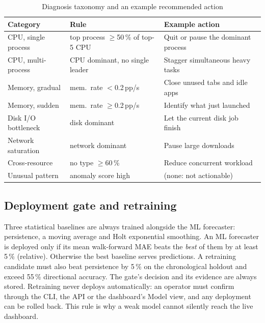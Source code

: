 \documentclass[conference]{IEEEtran}
\newcommand{\pp}{\,pp}
\begin{document}
\begin{table}[t]
\centering
\caption{Diagnosis taxonomy and an example recommended action}
\label{tab:taxonomy}
\begin{tabular}{@{}p{2.7cm}p{2.3cm}p{2.4cm}@{}}
\toprule
Category & Rule & Example action \\
\midrule
CPU, single process & top process $\ge$50\,\% of top-5 CPU & Quit or pause the dominant process \\
CPU, multi-process & CPU dominant, no single leader & Stagger simultaneous heavy tasks \\
Memory, gradual & mem.\ rate $<$0.2\pp/s & Close unused tabs and idle apps \\
Memory, sudden & mem.\ rate $\ge$0.2\pp/s & Identify what just launched \\
Disk I/O bottleneck & disk dominant & Let the current disk job finish \\
Network saturation & network dominant & Pause large downloads \\
Cross-resource & no type $\ge$60\,\% & Reduce concurrent workload \\
Unusual pattern & anomaly score high & (none: not actionable) \\
\bottomrule
\end{tabular}
\end{table}

\subsection{Deployment gate and retraining}\label{sec:gate}
Three statistical baselines are always trained alongside the ML forecaster:
persistence, a moving average and Holt exponential smoothing. An ML forecaster
is deployed only if its mean walk-forward MAE beats the \emph{best} of them by
at least 5\,\% (relative). Otherwise the best baseline serves predictions. A
retraining candidate must also beat persistence by 5\,\% on the chronological
holdout and exceed 55\,\% directional accuracy. The gate's decision and its
evidence are always stored. Retraining never deploys automatically: an
operator must confirm through the CLI, the API or the dashboard's Model view, and any
deployment can be rolled back. This rule is why a weak model cannot silently
reach the live dashboard.
\end{document}
